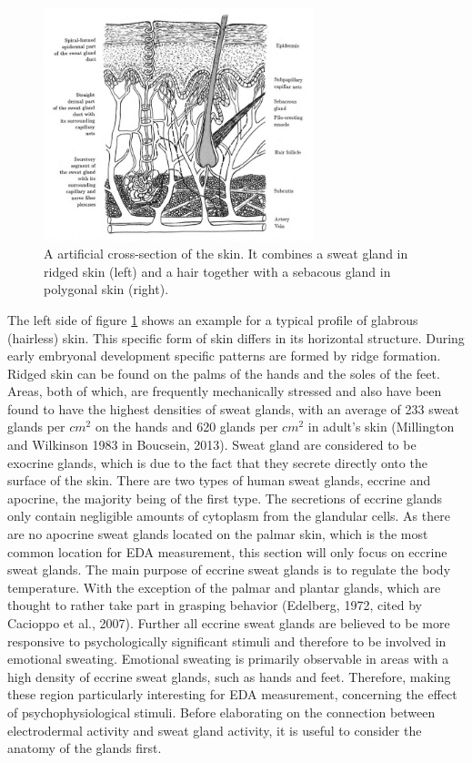 \begin{figure}[ht]
\centering
\includegraphics[width=0.7\textwidth]{images/skinDermis.png}
\caption{A artificial cross-section of the skin. It combines a sweat gland in ridged skin (left) and a hair together with a sebacous gland in polygonal skin (right).\citep{boucsein2013electrodermal}}
\label{DermisImg}
\end{figure} 

The left side of figure \ref{DermisImg} shows an example for a typical profile of glabrous (hairless) skin. This specific form of skin differs in its horizontal structure. During early embryonal development specific patterns are formed by ridge formation. Ridged skin can be found on the palms of the hands and the soles of the feet. Areas, both of which, are frequently mechanically stressed and also have been found to have the highest densities of sweat glands, with an average of 233 sweat glands per $cm^{2}$ on the hands and 620 glands per $cm^{2}$ in adult's skin (Millington and Wilkinson 1983 in Boucsein, 2013). Sweat gland are considered to be exocrine glands, which is due to the fact that they secrete directly onto the surface of the skin. There are two types of human sweat glands, eccrine and apocrine, the majority being of the first type. The secretions of eccrine glands only contain negligible amounts of cytoplasm from the glandular cells. As there are no apocrine sweat glands located on the palmar skin, which is the most common location for EDA measurement, this section will only focus on eccrine sweat glands. The main purpose of eccrine sweat glands is to regulate the body temperature. With the exception of the palmar and plantar glands, which are thought to rather take part in grasping behavior (Edelberg, 1972, cited by Cacioppo et al., 2007). Further all eccrine sweat glands are believed to be more responsive to psychologically significant stimuli and therefore to be involved in emotional sweating. Emotional sweating is primarily observable in areas with a high density of eccrine sweat glands, such as hands and feet. Therefore, making these region particularly interesting for EDA measurement, concerning the effect of psychophysiological stimuli. Before elaborating on the connection between electrodermal activity and sweat gland activity, it is useful to consider the anatomy of the glands first.

